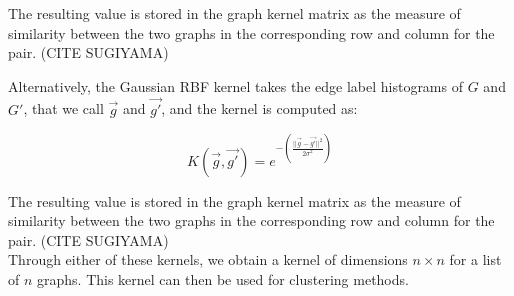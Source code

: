 The resulting value is stored in the graph kernel matrix as the measure of similarity between the two graphs in the corresponding row and column for the pair. (CITE SUGIYAMA)

Alternatively, the Gaussian RBF kernel takes the edge label histograms of $G$ and $G'$, that we call $\vec{g}$ and $\vec{g'}$, and the kernel is computed as:

$$K(\vec{g},\vec{g'}) = e^{-(\frac{||\vec{g}- \vec{g'}||^2}{2 \sigma^2})}$$

The resulting value is stored in the graph kernel matrix as the measure of similarity between the two graphs in the corresponding row and column for the pair. (CITE SUGIYAMA)\\

Through either of these kernels, we obtain a kernel of dimensions $n \times n$ for a list of $n$ graphs. This kernel can then be used for clustering methods.



